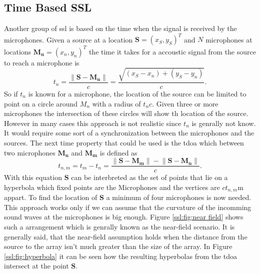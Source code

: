 \subsection{Time Based SSL}
Another group of \acrshort*{ssl} is based on the time when the
signal is received by the microphones.
Given a source at a location $\bm{S} = (x_S,y_S)^T$ and $N$ microphones at locations
$\bm{M_n} = (x_n,y_n)^T$ the time it takes for a accoustic signal from the source to reach a microphone is
\begin{equation}
  t_n = \frac{\lVert \bm{S} - \bm{M_n}\rVert}{c}
  = \frac{\sqrt{\left(x_S - x_n\right) + \left(y_S - y_n\right)}}{c} .
\end{equation}
So if $t_n$ is known for a microphone, the location of the source can be limited to point on a circle
around $M_n$ with a radius of $t_n c$.
Given three or more microphones the intersection of these circles will show th location of the source.
However in many cases this approach is not realistic since $t_n$ is genrally not know. 
It would require some sort of a synchronization between the microphones and the sources.
The next time property that could be used is the \acrfull{tdoa} which between 
two microphones $\bm{M_n}$ and $\bm{M_m}$ is defined as 
\begin{equation}
  t_{n, m} = t_m - t_n = \frac{\lVert \bm{S} - \bm{M_m}\rVert - \lVert \bm{S} - \bm{M_n}\rVert}{c}.
\end{equation}
With this equation $\bm{S}$ can be interbreted as the set of points that lie on a hyperbola
which fixed points are the Microphones and the vertices are $c t_{n,m}$m appart.
To find the location of $\bm{S}$ a minimum of four microphones is now needed.
This approach works only if we can assume that the curvature of the incomming sound waves
at the microphones is big enough. Figure \ref{ssl:fig:near field} shows such a arrangement
which is genrally known as the near-field scenario. 
It is generally said, that the near-field assumption holds when the distance from the source
to the array isn't much greater than the size of the array.
In Figure \ref{ssl:fig:hyperbola} it can be seen how the resulting hyperbolas from the 
\acrshort{tdoa} intersect at the point $\bm{S}$.

